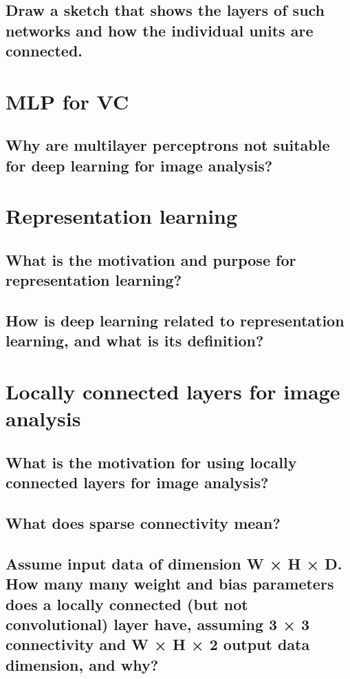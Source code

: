 \subsection{Draw a sketch that shows the layers of such networks and how the individual units are connected.}

\section{MLP for VC}

\subsection{Why are multilayer perceptrons not suitable for deep learning for image analysis?}

\section{Representation learning}

\subsection{What is the motivation and purpose for representation learning?}

\subsection{How is deep learning related to representation learning, and what is its definition?}

\section{Locally connected layers for image analysis}

\subsection{What is the motivation for using locally connected layers for image analysis?}

\subsection{What does sparse connectivity mean?}

\subsection{Assume input data of dimension W × H × D. How many many weight and bias parameters does a locally connected (but not convolutional) layer have, assuming 3 × 3 connectivity and W × H × 2 output data dimension, and why?}


